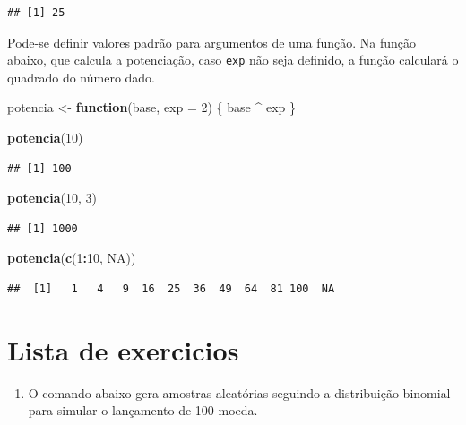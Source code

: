 \documentclass[
]{book}
\newenvironment{Shaded}{\begin{snugshade}}{\end{snugshade}}
\newcommand{\AttributeTok}[1]{\textcolor[rgb]{0.13,0.29,0.53}{#1}}
\newcommand{\ConstantTok}[1]{\textcolor[rgb]{0.56,0.35,0.01}{#1}}
\newcommand{\ControlFlowTok}[1]{\textcolor[rgb]{0.13,0.29,0.53}{\textbf{#1}}}
\newcommand{\DecValTok}[1]{\textcolor[rgb]{0.00,0.00,0.81}{#1}}
\newcommand{\FunctionTok}[1]{\textcolor[rgb]{0.13,0.29,0.53}{\textbf{#1}}}
\newcommand{\NormalTok}[1]{#1}
\newcommand{\OtherTok}[1]{\textcolor[rgb]{0.56,0.35,0.01}{#1}}
\newcommand{\SpecialCharTok}[1]{\textcolor[rgb]{0.81,0.36,0.00}{\textbf{#1}}}
\providecommand{\tightlist}{%
  \setlength{\itemsep}{0pt}\setlength{\parskip}{0pt}}
\begin{document}
\begin{verbatim}
## [1] 25
\end{verbatim}

Pode-se definir valores padrão para argumentos de uma função.
Na função abaixo, que calcula a potenciação, caso \texttt{exp} não seja definido, a função calculará o quadrado do número dado.

\begin{Shaded}
\begin{Highlighting}[]
\NormalTok{potencia }\OtherTok{\textless{}{-}} \ControlFlowTok{function}\NormalTok{(base, }\AttributeTok{exp =} \DecValTok{2}\NormalTok{) \{}
\NormalTok{  base }\SpecialCharTok{\^{}}\NormalTok{ exp}
\NormalTok{\}}

\FunctionTok{potencia}\NormalTok{(}\DecValTok{10}\NormalTok{)}
\end{Highlighting}
\end{Shaded}

\begin{verbatim}
## [1] 100
\end{verbatim}

\begin{Shaded}
\begin{Highlighting}[]
\FunctionTok{potencia}\NormalTok{(}\DecValTok{10}\NormalTok{, }\DecValTok{3}\NormalTok{)}
\end{Highlighting}
\end{Shaded}

\begin{verbatim}
## [1] 1000
\end{verbatim}

\begin{Shaded}
\begin{Highlighting}[]
\FunctionTok{potencia}\NormalTok{(}\FunctionTok{c}\NormalTok{(}\DecValTok{1}\SpecialCharTok{:}\DecValTok{10}\NormalTok{, }\ConstantTok{NA}\NormalTok{))}
\end{Highlighting}
\end{Shaded}

\begin{verbatim}
##  [1]   1   4   9  16  25  36  49  64  81 100  NA
\end{verbatim}

\section{Lista de exercicios}\label{lista-de-exercicios}

\begin{enumerate}
\def\labelenumi{\arabic{enumi}.}
\tightlist
\item
  O comando abaixo gera amostras aleatórias seguindo a distribuição binomial para simular o lançamento de 100 moeda.
\end{enumerate}
\end{document}
